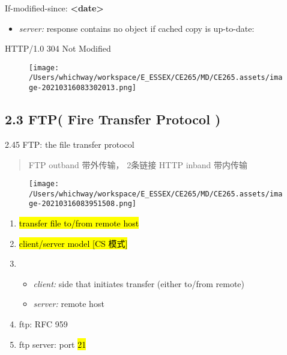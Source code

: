 \documentclass[
]{article}
\newenvironment{Shaded}{}{}
\newcommand{\KeywordTok}[1]{\textcolor[rgb]{0.00,0.44,0.13}{\textbf{#1}}}
\newcommand{\NormalTok}[1]{#1}
\begin{document}
\begin{Shaded}
\begin{Highlighting}[]
\NormalTok{If{-}modified{-}since: }\KeywordTok{\textless{}date\textgreater{}}
\end{Highlighting}
\end{Shaded}

\begin{itemize}
\item
  \emph{server:} response contains no object if cached copy is
  up-to-date:
\end{itemize}

\begin{Shaded}
\begin{Highlighting}[]
\NormalTok{HTTP/1.0 304 Not Modified}
\end{Highlighting}
\end{Shaded}

\begin{figure}
\centering
\texttt{[image: /Users/whichway/workspace/E\_ESSEX/CE265/MD/CE265.assets/image-20210316083302013.png]}
\caption{}
\end{figure}

\hypertarget{23-ftp-fire-transfer-protocol-}{%
\subsection{2.3 FTP( Fire Transfer Protocol
)}\label{23-ftp-fire-transfer-protocol-}}

2.45 FTP: the file transfer protocol

\begin{quote}
FTP outband 带外传输， 2条链接 HTTP inband 带内传输
\end{quote}

\begin{figure}
\centering
\texttt{[image: /Users/whichway/workspace/E\_ESSEX/CE265/MD/CE265.assets/image-20210316083951508.png]}
\caption{}
\end{figure}

\begin{enumerate}
\def\labelenumi{\arabic{enumi}.}
\item
  \hl{transfer file to/from remote host}
\item
  \hl{client/server model {[}CS 模式{]}}
\item
  \begin{itemize}
  \item
    \emph{client:} side that initiates transfer (either to/from remote)
  \item
    \emph{server:} remote host
  \end{itemize}
\item
  ftp: RFC 959
\item
  ftp server: port \hl{21}
\end{enumerate}
\end{document}
